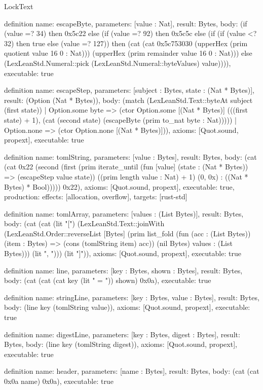 \begin{lexlean}{LockText}
\begin{semanticmodule}
definition{
  name: escapeByte,
  parameters: [value : Nat],
  result: Bytes,
  body: (if (value =? 34) then 0x5c22 else (if (value =? 92) then 0x5c5c else (if (if (value <? 32) then true else (value =? 127)) then (cat (cat 0x5c753030 (upperHex (prim quotient value 16 0 : Nat))) (upperHex (prim remainder value 16 0 : Nat))) else (LexLeanStd.Numeral::pick (LexLeanStd.Numeral::byteValues) value)))),
  executable: true
}

definition{
  name: escapeStep,
  parameters: [subject : Bytes, state : (Nat * Bytes)],
  result: (Option (Nat * Bytes)),
  body: (match (LexLeanStd.Text::byteAt subject (first state))
    | Option.some byte => (ctor Option.some [(Nat * Bytes)] (((first state) + 1), (cat (second state) (escapeByte (prim to_nat byte : Nat)))))
    | Option.none => (ctor Option.none [(Nat * Bytes)])),
  axioms: [Quot.sound, propext],
  executable: true
}

definition{
  name: tomlString,
  parameters: [value : Bytes],
  result: Bytes,
  body: (cat (cat 0x22 (second (first (prim iterate_until (fun [value] (state : (Nat * Bytes)) => (escapeStep value state)) ((prim length value : Nat) + 1) (0, 0x) : ((Nat * Bytes) * Bool))))) 0x22),
  axioms: [Quot.sound, propext],
  executable: true,
  production: {effects: [allocation, overflow], targets: [rust-std]}
}

definition{
  name: tomlArray,
  parameters: [values : (List Bytes)],
  result: Bytes,
  body: (cat (cat (lit "[") (LexLeanStd.Text::joinWith (LexLeanStd.Order::reverseList [Bytes] (prim list_fold (fun (acc : (List Bytes)) (item : Bytes) => (cons (tomlString item) acc)) (nil Bytes) values : (List Bytes))) (lit ", "))) (lit "]")),
  axioms: [Quot.sound, propext],
  executable: true
}

definition{
  name: line,
  parameters: [key : Bytes, shown : Bytes],
  result: Bytes,
  body: (cat (cat (cat key (lit " = ")) shown) 0x0a),
  executable: true
}

definition{
  name: stringLine,
  parameters: [key : Bytes, value : Bytes],
  result: Bytes,
  body: (line key (tomlString value)),
  axioms: [Quot.sound, propext],
  executable: true
}

definition{
  name: digestLine,
  parameters: [key : Bytes, digest : Bytes],
  result: Bytes,
  body: (line key (tomlString digest)),
  axioms: [Quot.sound, propext],
  executable: true
}

definition{
  name: header,
  parameters: [name : Bytes],
  result: Bytes,
  body: (cat (cat 0x0a name) 0x0a),
  executable: true
}


\end{semanticmodule}
\end{lexlean}
